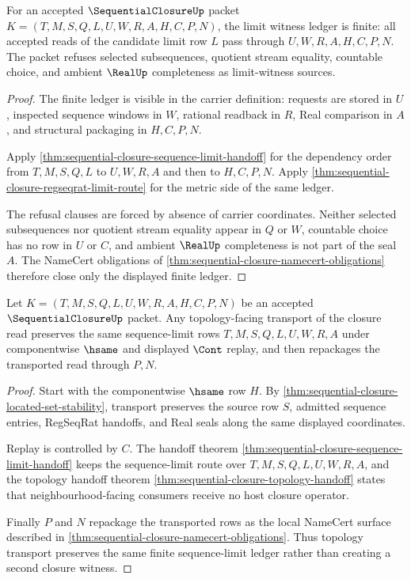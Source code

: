\begin{theorem}
\label{thm:sequential-closure-root-limit-ledger}
For an accepted $\SequentialClosureUp$ packet $K=(T,M,S,Q,L,U,W,R,A,H,C,P,N)$, the limit witness ledger is finite: all accepted reads of the candidate limit row $L$ pass through $U,W,R,A,H,C,P,N$. The packet refuses selected subsequences, quotient stream equality, countable choice, and ambient $\RealUp$ completeness as limit-witness sources.
\end{theorem}
\begin{proof}
The finite ledger is visible in the carrier definition: requests are stored in $U$, inspected sequence windows in $W$, rational readback in $R$, Real comparison in $A$, and structural packaging in $H,C,P,N$.

Apply \autoref{thm:sequential-closure-sequence-limit-handoff} for the dependency order from $T,M,S,Q,L$ to $U,W,R,A$ and then to $H,C,P,N$. Apply \autoref{thm:sequential-closure-regseqrat-limit-route} for the metric side of the same ledger.

The refusal clauses are forced by absence of carrier coordinates. Neither selected subsequences nor quotient stream equality appear in $Q$ or $W$, countable choice has no row in $U$ or $C$, and ambient $\RealUp$ completeness is not part of the seal $A$. The NameCert obligations of \autoref{thm:sequential-closure-namecert-obligations} therefore close only the displayed finite ledger.
\end{proof}

\begin{theorem}
\label{thm:sequential-closure-root-topology-transport}
Let $K=(T,M,S,Q,L,U,W,R,A,H,C,P,N)$ be an accepted $\SequentialClosureUp$ packet. Any topology-facing transport of the closure read preserves the same sequence-limit rows $T,M,S,Q,L,U,W,R,A$ under componentwise $\hsame$ and displayed $\Cont$ replay, and then repackages the transported read through $P,N$.
\end{theorem}
\begin{proof}
Start with the componentwise $\hsame$ row $H$. By \autoref{thm:sequential-closure-located-set-stability}, transport preserves the source row $S$, admitted sequence entries, RegSeqRat handoffs, and Real seals along the same displayed coordinates.

Replay is controlled by $C$. The handoff theorem \autoref{thm:sequential-closure-sequence-limit-handoff} keeps the sequence-limit route over $T,M,S,Q,L,U,W,R,A$, and the topology handoff theorem \autoref{thm:sequential-closure-topology-handoff} states that neighbourhood-facing consumers receive no host closure operator.

Finally $P$ and $N$ repackage the transported rows as the local NameCert surface described in \autoref{thm:sequential-closure-namecert-obligations}. Thus topology transport preserves the same finite sequence-limit ledger rather than creating a second closure witness.
\end{proof}


